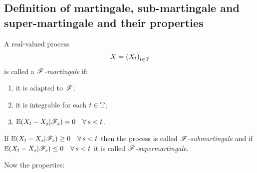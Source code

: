 \documentclass{report}
\begin{document}
\subsection{Definition of martingale, sub-martingale and super-martingale and their properties}
\begin{definition}
	A real-valued process
	\[X={(X_t)}_{t\in\mathbb{T}}\]
	is called a \emph{$\mathscr{F}$-martingale} if:
	\begin{enumerate}
		\item it is adapted to $\mathscr{F}$;
		\item it is integrable for each $t\in\mathbb{T}$;
		\item $\mathbb{E}(X_t-X_s|\mathscr{F}_s)=0\quad\forall\, s<t$.
	\end{enumerate}
	If $\mathbb{E}(X_t-X_s|\mathscr{F}_s)\geq0\quad\forall\, s<t$ then the process is called \emph{$\mathscr{F}$-submartingale} and if $\mathbb{E}(X_t-X_s|\mathscr{F}_s)\leq0\quad\forall\, s<t$ it is called \emph{$\mathscr{F}$-supermartingale}.
\end{definition}
Now the properties:
\end{document}
